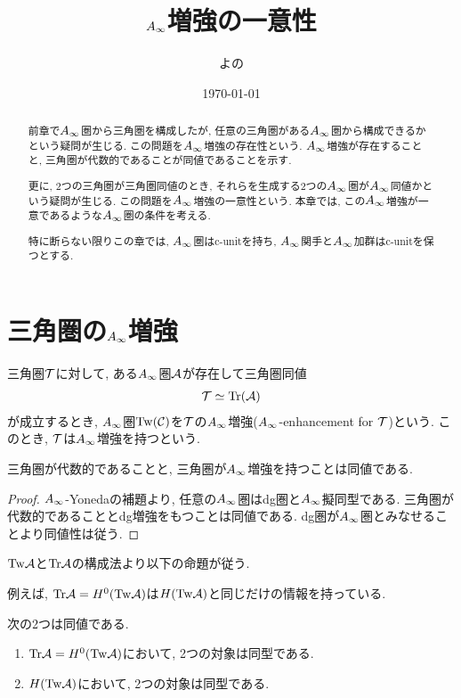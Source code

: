 \documentclass[uplatex, a4paper, 14Q, dvipdfmx]{jsarticle}
\title{\texorpdfstring{$\Ainf$}{Ainf}増強の一意性}
\author{よの}
\date{\today}
\begin{document}
\maketitle

\begin{abstract}
  前章で$\Ainf$圏から三角圏を構成したが, 任意の三角圏がある$\Ainf$圏から構成できるかという疑問が生じる. 
  この問題を$\Ainf$増強の存在性という. 
  $\Ainf$増強が存在することと, 三角圏が代数的であることが同値であることを示す. 

  更に, 2つの三角圏が三角圏同値のとき, それらを生成する2つの$\Ainf$圏が$\Ainf$同値かという疑問が生じる. 
  この問題を$\Ainf$増強の一意性という. 
  本章では, この$\Ainf$増強が一意であるような$\Ainf$圏の条件を考える. 

  特に断らない限りこの章では, $\Ainf$圏はc-unitを持ち, $\Ainf$関手と$\Ainf$加群はc-unitを保つとする. 
\end{abstract}

\tableofcontents

\section{三角圏の\texorpdfstring{$\Ainf$}{Ainf}増強}

\begin{definition}[$\Ainf$増強]
  三角圏$\mathcal{T}$に対して, ある$\Ainf$圏$\mathcal{A}$が存在して三角圏同値
  \begin{align*}
    \mathcal{T} \simeq \mathrm{Tr}(\mathcal{A})
  \end{align*}
  が成立するとき, $\Ainf$圏$\mathrm{Tw}(\mathcal{C})$を$\mathcal{T}$の$\Ainf$増強($\Ainf$-enhancement for $\mathcal{T}$)という.
  このとき, $\mathcal{T}$は$\Ainf$増強を持つという. 
\end{definition}

\begin{lemma}
  三角圏が代数的であることと, 三角圏が$\Ainf$増強を持つことは同値である. 
\end{lemma}

\begin{proof}
  $\Ainf$-Yonedaの補題より, 任意の$\Ainf$圏はdg圏と$\Ainf$擬同型である.
  三角圏が代数的であることとdg増強をもつことは同値である.
  dg圏が$\Ainf$圏とみなせることより同値性は従う.
\end{proof}

$\mathrm{Tw}\mathcal{A}$と$\mathrm{Tr}\mathcal{A}$の構成法より以下の命題が従う. 

例えば, $\mathrm{Tr}\mathcal{A} = H^0(\mathrm{Tw}\mathcal{A})$は$H(\mathrm{Tw}\mathcal{A})$と同じだけの情報を持っている. 

\begin{lemma}
  次の2つは同値である.
  \begin{enumerate}
    \item $\mathrm{Tr}\mathcal{A} = H^0(\mathrm{Tw}\mathcal{A})$において, 2つの対象は同型である.
    \item $H(\mathrm{Tw}\mathcal{A})$において, 2つの対象は同型である. 
  \end{enumerate}
\end{lemma}
\end{document}
